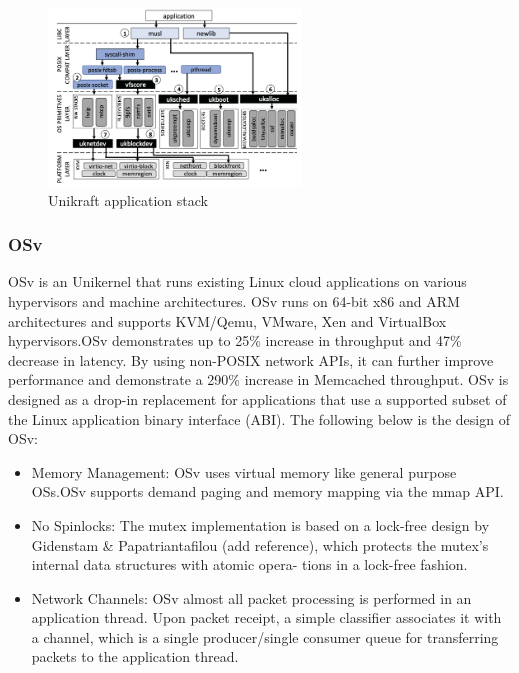 \begin{figure}[htbp!] 
  \centering    
  \includegraphics[width=0.6\textwidth]{UnikraftStack}
  \caption[Unikraft]{Unikraft application stack}
  \label{fig:UnikraftStack}
  \end{figure}

\subsubsection{OSv}
OSv is an Unikernel that runs existing Linux cloud applications on various hypervisors 
and machine architectures. OSv runs on 64-bit x86 and
ARM architectures and supports KVM/Qemu, VMware, Xen and VirtualBox 
hypervisors.OSv demonstrates up to 25\% increase in throughput and 47\% 
decrease in latency. 
By using non-POSIX network APIs,
it can further improve performance and demonstrate a
290\% increase in Memcached throughput.
OSv is designed as a drop-in replacement for applications that use a
supported subset of the Linux application binary interface (ABI).
The following below is the design of OSv: 
\begin{itemize}
  \item Memory Management: OSv uses virtual memory like
  general purpose OSs.OSv supports demand paging and memory mapping
  via the mmap API.
  \item No Spinlocks: The mutex implementation is based on a lock-free design 
  by Gidenstam \& Papatriantafilou (add reference), which protects
  the mutex’s internal data structures with atomic opera-
  tions in a lock-free fashion.
  \item Network Channels: OSv almost all packet processing is performed in an application thread. 
  Upon packet receipt, a simple classifier associates it with a channel, which is a single producer/single
  consumer queue for transferring packets to the application thread.
\end{itemize}

